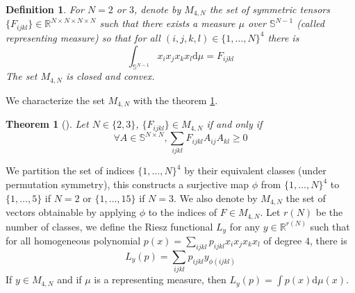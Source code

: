 \documentclass[preprint,3p]{elsarticle}
\newtheorem{theorem}{Theorem}[section]
\newtheorem{definition}{Definition}[section]
\begin{document}
\begin{definition}
    For $N=2$ or $3$, denote by $M_{4,N}$ the set of symmetric tensors $\{F_{ijkl}\}\in\mathbb{R}^{N\times N\times N \times N}$ such that there exists a measure $\mu$ over $\mathbb{S}^{N-1}$ (called representing measure) so that for all $(i,j,k,l)\in\{1,\dots,N\}^{4}$ there is \begin{equation}
        \int_{\mathbb{S}^{N-1}} x_ix_jx_kx_l\mathrm{d}\mu = F_{ijkl}
    \end{equation}
    The set $M_{4,N}$ is closed and convex.
\end{definition}
We characterize the set $M_{4,N}$ with the theorem \ref{thrm:m4n_sdp}.
\begin{theorem}[\cite{francfort1995fourth}]\label{thrm:m4n_sdp}
    Let $N\in\{2,3\}$, $\{F_{ijkl}\}\in M_{4,N}$ if and only if \begin{equation}
        \forall A\in\mathbb{S}^{N\times N}, \sum_{ijkl}F_{ijkl}A_{ij}A_{kl}\geq 0
    \end{equation}
\end{theorem}
We partition the set of indices $\{1,\dots,N\}^{4}$ by their equivalent classes (under permutation symmetry), this constructs a surjective map $\phi$ from $\{1,\dots,N\}^{4}$ to $\{1,\dots,5\}$ if $N=2$ or $\{1,\dots,15\}$ if $N=3$. We also denote by $M_{4,N}$ the set of vectors obtainable by applying $\phi$ to the indices of $F\in M_{4,N}$. Let $r(N)$ be the number of classes, we define the Riesz functional $L_y$ for any $y\in \mathbb{R}^{r(N)}$ such that for all homogeneous polynomial $p(x)=\sum_{ijkl}p_{ijkl}x_ix_jx_kx_l$ of degree $4$, there is \begin{equation}
    L_y(p)=\sum_{ijkl}p_{ijkl}y_{\phi(ijkl)}
\end{equation}
If $y\in M_{4,N}$ and if $\mu$ is a representing measure, then $L_y(p)=\int p(x)\mathrm{d}\mu(x)$.
\end{document}
